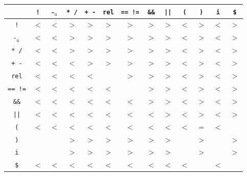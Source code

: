 \begin{tabular}{c|cccccccccccc}
\toprule
 & \texttt{!} & -$_u$ & \texttt{* /} & \texttt{+ -} & \texttt{rel} & \texttt{== !=} & \texttt{\&\&} & \texttt{||} & \texttt{(} & \texttt{)} & \texttt{i} & \texttt{\$} \\
\midrule
\texttt{!} & $<$ & $<$ & $>$ & $>$ & $>$ & $>$ & $>$ & $>$ & $<$ & $>$ & $<$ & $>$ \\
-$_u$ & $<$ & $<$ & $>$ & $>$ & $>$ & $>$ & $>$ & $>$ & $<$ & $>$ & $<$ & $>$ \\
\texttt{* /} & $<$ & $<$ & $>$ & $>$ & $>$ & $>$ & $>$ & $>$ & $<$ & $>$ & $<$ & $>$ \\
\texttt{+ -} & $<$ & $<$ & $<$ & $>$ & $>$ & $>$ & $>$ & $>$ & $<$ & $>$ & $<$ & $>$ \\
\texttt{rel} & $<$ & $<$ & $<$ & $<$ &  & $>$ & $>$ & $>$ & $<$ & $>$ & $<$ & $>$ \\
\texttt{== !=} & $<$ & $<$ & $<$ & $<$ & $<$ &  & $>$ & $>$ & $<$ & $>$ & $<$ & $>$ \\
\texttt{\&\&} & $<$ & $<$ & $<$ & $<$ & $<$ & $<$ & $>$ & $>$ & $<$ & $>$ & $<$ & $>$ \\
\texttt{||} & $<$ & $<$ & $<$ & $<$ & $<$ & $<$ & $<$ & $>$ & $<$ & $>$ & $<$ & $>$ \\
\texttt{(} & $<$ & $<$ & $<$ & $<$ & $<$ & $<$ & $<$ & $<$ & $<$ & $=$ & $<$ &  \\
\texttt{)} &  &  & $>$ & $>$ & $>$ & $>$ & $>$ & $>$ &  & $>$ &  & $>$ \\
\texttt{i} &  &  & $>$ & $>$ & $>$ & $>$ & $>$ & $>$ &  & $>$ &  & $>$ \\
\texttt{\$} & $<$ & $<$ & $<$ & $<$ & $<$ & $<$ & $<$ & $<$ & $<$ &  & $<$ &  \\
\bottomrule
\end{tabular}
